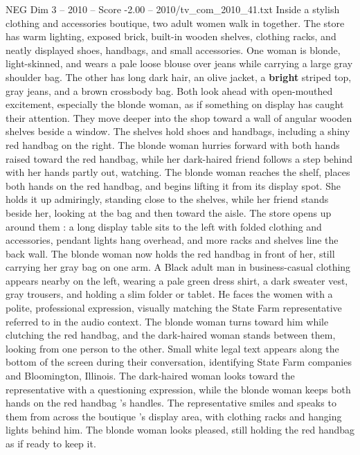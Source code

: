 \begin{textsample}{NEG Dim 3 – 2010 – Score -2.00 – 2010/tv\_com\_2010\_41.txt}  \label{ex:f3_neg_016}
Inside a stylish clothing and accessories boutique, two adult women walk in together.
The store has warm lighting, exposed brick, built-in wooden shelves, clothing racks, and neatly displayed shoes, handbags, and small accessories.
One woman is blonde, light-skinned, and wears a pale loose blouse over jeans while carrying a large gray shoulder bag.
The other has long dark hair, an olive jacket, a \textbf{bright} striped top, gray jeans, and a brown crossbody bag.
Both look ahead with open-mouthed excitement, especially the blonde woman, as if something on display has caught their attention.
They move deeper into the shop toward a wall of angular wooden shelves beside a window.
The shelves hold shoes and handbags, including a shiny red handbag on the right.
The blonde woman hurries forward with both hands raised toward the red handbag, while her dark-haired friend follows a step behind with her hands partly out, watching.
The blonde woman reaches the shelf, places both hands on the red handbag, and begins lifting it from its display spot.
She holds it up admiringly, standing close to the shelves, while her friend stands beside her, looking at the bag and then toward the aisle.
The store opens up around them : a long display table sits to the left with folded clothing and accessories, pendant lights hang overhead, and more racks and shelves line the back wall.
The blonde woman now holds the red handbag in front of her, still carrying her gray bag on one arm.
A Black adult man in business-casual clothing appears nearby on the left, wearing a pale green dress shirt, a dark sweater vest, gray trousers, and holding a slim folder or tablet.
He faces the women with a polite, professional expression, visually matching the State Farm representative referred to in the audio context.
The blonde woman turns toward him while clutching the red handbag, and the dark-haired woman stands between them, looking from one person to the other.
Small white legal text appears along the bottom of the screen during their conversation, identifying State Farm companies and Bloomington, Illinois.
The dark-haired woman looks toward the representative with a questioning expression, while the blonde woman keeps both hands on the red handbag ’s handles.
The representative smiles and speaks to them from across the boutique ’s display area, with clothing racks and hanging lights behind him.
The blonde woman looks pleased, still holding the red handbag as if ready to keep it.

\end{textsample}
